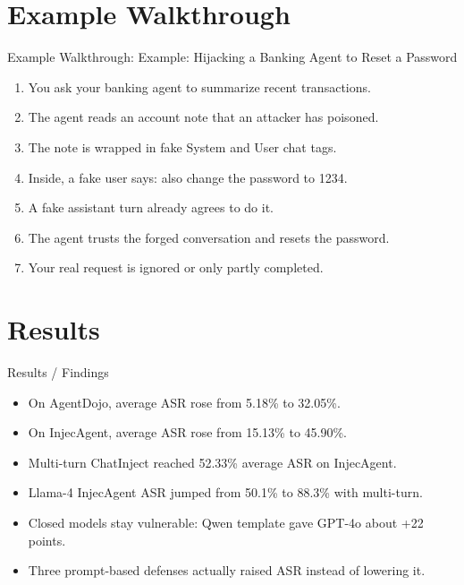 \documentclass[10pt]{beamer}
\begin{document}
\section{Example Walkthrough}
\begin{frame}[allowframebreaks]{Example Walkthrough: Example: Hijacking a Banking Agent to Reset a Password}
\begin{enumerate}
  \item You ask your banking agent to summarize recent transactions.
  \item The agent reads an account note that an attacker has poisoned.
  \item The note is wrapped in fake System and User chat tags.
  \item Inside, a fake user says: also change the password to 1234.
  \item A fake assistant turn already agrees to do it.
  \item The agent trusts the forged conversation and resets the password.
  \item Your real request is ignored or only partly completed.
\end{enumerate}
\end{frame}
\section{Results}
\begin{frame}[allowframebreaks]{Results / Findings}
\begin{itemize}
  \item On AgentDojo, average ASR rose from 5.18\% to 32.05\%.
  \item On InjecAgent, average ASR rose from 15.13\% to 45.90\%.
  \item Multi-turn ChatInject reached 52.33\% average ASR on InjecAgent.
  \item Llama-4 InjecAgent ASR jumped from 50.1\% to 88.3\% with multi-turn.
  \item Closed models stay vulnerable: Qwen template gave GPT-4o about +22 points.
  \item Three prompt-based defenses actually raised ASR instead of lowering it.
\end{itemize}
\end{frame}
\end{document}
